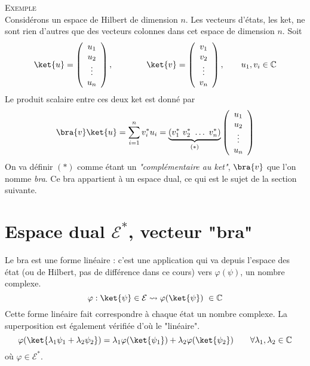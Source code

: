 \textsc{Exemple}\\
Considérons un espace de Hilbert de dimension $n$. Les vecteurs d'états, les ket, ne sont rien 
d'autres que des vecteurs colonnes dans cet espace de dimension $n$. Soit
\begin{equation}
\ket{u} = \left(\begin{array}{c}
u_1\\
u_2\\
\vdots\\
u_n
\end{array}\right),\qquad\qquad \ket{v} = \left(\begin{array}{c}
v_1\\
v_2\\
\vdots\\
v_n
\end{array}\right),\qquad u_1,v_i\in\mathbb{C}
\end{equation}
Le produit scalaire entre ces deux ket est donné par
\begin{equation}
\bra{v}\ket{u} = \sum_{i=1}^n v_i^*u_i = \underbrace{(v_1^*\ v_2^*\ \dots\ v_n^*)}_{(*)}
\left(\begin{array}{c}
u_1\\
u_2\\
\vdots\\
u_n
\end{array}\right)
\end{equation}
On va définir $(*)$ comme étant un \textit{"complémentaire au ket"}, $\bra{v}$ que l'on 
nomme \textit{bra}. Ce bra appartient à un espace dual, ce qui est le sujet de la 
section suivante.


\section{Espace dual $\mathcal{E}^*$, vecteur "bra"}
Le bra est une forme linéaire : c'est une application qui va depuis l'espace des état 
(ou de Hilbert, pas de différence dans ce cours) vers $\varphi(\psi)$, un nombre complexe.
\begin{equation}
\varphi : \ket{\psi}\in\mathcal{E} \leadsto \varphi(\ket{\psi})\ \in \mathbb{C}
\end{equation}
Cette forme linéaire fait correspondre à chaque état un nombre complexe. La superposition 
est également vérifiée d'où le "linéaire".
\begin{equation}
\varphi(\ket{\lambda_1\psi_1 + \lambda_2\psi_2}) = \lambda_1\varphi(\ket{\psi_1})+
\lambda_2\varphi(\ket{\psi_2})\qquad \forall \lambda_1,\lambda_2\in\mathbb{C}
\end{equation}
où $\varphi \in \mathcal{E}^*$.\\

